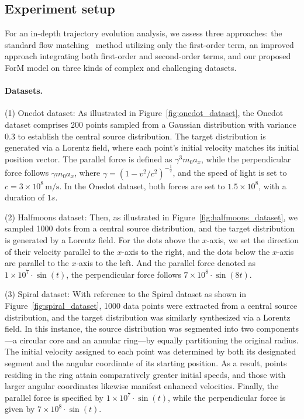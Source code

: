 \subsection{Experiment setup} \label{sec:exp:experiment_setup}
For an in-depth trajectory evolution analysis, we assess three approaches: the standard flow matching~\cite{lcb+22} method utilizing only the first-order term, an improved approach integrating both first-order and second-order terms, and our proposed ForM model on three kinds of complex and challenging datasets.

\paragraph{Datasets.} (1) Onedot dataset: As illustrated in Figure~\ref{fig:onedot_dataset}, the Onedot dataset comprises 200 points sampled from a Gaussian distribution with variance $0.3$ to establish the central source distribution. The target distribution is generated via a Lorentz field, where each point's initial velocity matches its initial position vector. The parallel force is defined as $\gamma^3 m_0 a_x$, while the perpendicular force follows $\gamma m_0 a_x$, where $\gamma = (1 - v^2 / c^2)^{-\frac{1}{2}}$, and the speed of light is set to \(c = 3 \times 10^8\,\text{m/s}\). In the Onedot dataset, both forces are set to $1.5 \times 10^8$, with a duration of $1s$. 

(2) Halfmoons dataset:
Then, as illustrated in Figure~\ref{fig:halfmoons_dataset}, we sampled 1000 dots from a central source distribution, and the target distribution is generated by a Lorentz field. For the dots above the $x$-axis, we set the direction of their velocity parallel to the $x$-axis to the right, and the dots below the $x$-axis are parallel to the $x$-axis to the left. And the parallel force denoted as $1 \times 10^7 \cdot \sin( t )$, the perpendicular force follows $7 \times 10^8 \cdot \sin( 8 t )$. 

(3) Spiral dataset: 
With reference to the Spiral dataset as shown in Figure~\ref{fig:spiral_dataset}, 1000 data points were extracted from a central source distribution, and the target distribution was similarly synthesized via a Lorentz field. In this instance, the source distribution was segmented into two components—a circular core and an annular ring—by equally partitioning the original radius. The initial velocity assigned to each point was determined by both its designated segment and the angular coordinate of its starting position. As a result, points residing in the ring attain comparatively greater initial speeds, and those with larger angular coordinates likewise manifest enhanced velocities. Finally, the parallel force is specified by $1 \times 10^7 \cdot \sin( t )$, while the perpendicular force is given by $7 \times 10^8 \cdot \sin( t )$.


